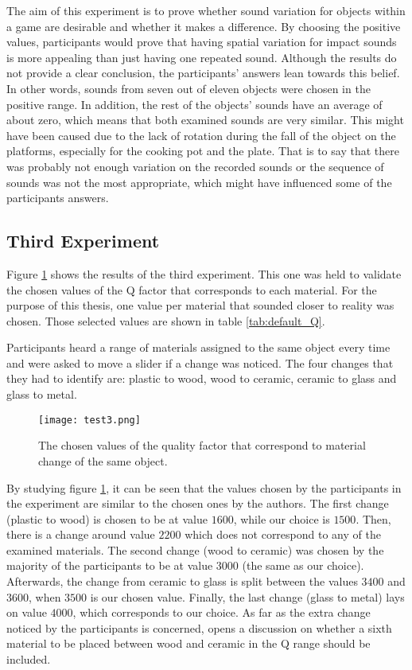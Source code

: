 The aim of this experiment is to prove whether sound variation for objects within a game are desirable and whether it makes a difference. By choosing the positive values, participants would prove that having spatial variation for impact sounds is more appealing than just having one repeated sound. Although the results do not provide a clear conclusion, the participants' answers lean towards this belief. In other words, sounds from seven out of eleven objects were chosen in the positive range. In addition, the rest of the objects' sounds have an average of about zero, which means that both examined sounds are very similar. This might have been caused due to the lack of rotation during the fall of the object on the platforms, especially for the cooking pot and the plate. That is to say that there was probably not enough variation on the recorded sounds or the sequence of sounds was not the most appropriate, which might have influenced some of the participants answers.

\subsection{Third Experiment}

Figure \ref{fig:test3} shows the results of the third experiment. This one was held to validate the chosen values of the \gls{Q} factor that corresponds to each material. For the purpose of this thesis, one value per material that sounded closer to reality was chosen. Those selected values are shown in table \ref{tab:default_Q}.  

Participants heard a range of materials assigned to the same object every time and were asked to move a slider if a change was noticed. The four changes that they had to identify are: plastic to wood, wood to ceramic, ceramic to glass and glass to metal.

\begin{figure}[H]
  \centering
    \texttt{[image: test3.png]}
      \caption{The chosen values of the quality factor that correspond to material change of the same object.}\label{fig:test3}
\end{figure}

By studying figure \ref{fig:test3}, it can be seen that the values chosen by the participants in the experiment are similar to the chosen ones by the authors. The first change (plastic to wood) is chosen to be at value $1600$, while our choice is $1500$. Then, there is a change around value $2200$ which does not correspond to any of the examined materials. The second change (wood to ceramic) was chosen by the majority of the participants to be at value $3000$ (the same as our choice). Afterwards, the change from ceramic to glass is split between the values $3400$ and $3600$, when $3500$ is our chosen value. Finally, the last change (glass to metal) lays on value $4000$, which corresponds to our choice. As far as the extra change noticed by the participants is concerned, opens a discussion on whether a sixth material to be placed between wood and ceramic in the \gls{Q} range should be included.
